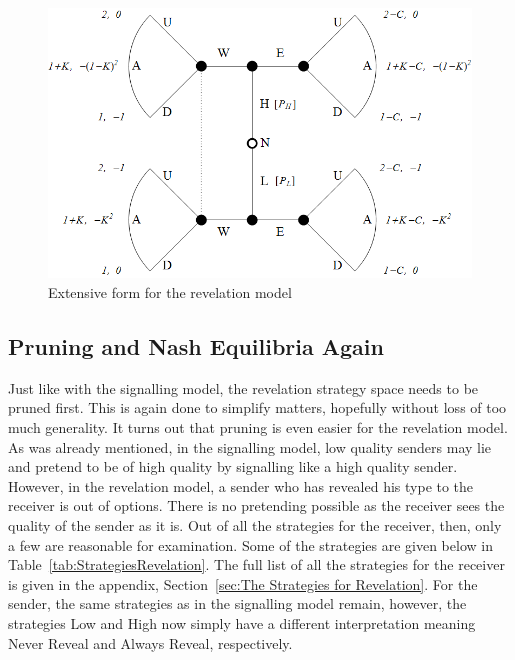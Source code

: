 \documentclass[a4paper,10pt]{article}
\numberwithin{equation}{section}
\begin{document}
\begin{figure}[h]
\begin{center}
\leavevmode
\includegraphics[scale=.4]{Graph5.png}
\end{center}
\caption{Extensive form for the revelation model}
\label{fig:Graph5.png}
\end{figure}

\subsection{Pruning and Nash Equilibria Again}
\label{sec:Pruning and Nash Equilibria Again}

Just like with the signalling model, the revelation strategy space needs to be pruned first. This is again done to simplify matters, hopefully without loss of too much generality. It turns out that pruning is even easier for the revelation model. As was already mentioned, in the signalling model, low quality senders may lie and pretend to be of high quality by signalling like a high quality sender. However, in the revelation model, a sender who has revealed his type to the receiver is out of options. There is no pretending possible as the receiver sees the quality of the sender as it is. Out of all the strategies for the receiver, then, only a few are reasonable for examination. Some of the strategies are given below in Table~\ref{tab:StrategiesRevelation}. The full list of all the strategies for the receiver is given in the appendix, Section~\ref{sec:The Strategies for Revelation}. For the sender, the same strategies as in the signalling model remain, however, the strategies Low and High now simply have a different interpretation meaning Never Reveal and Always Reveal, respectively.
\end{document}
